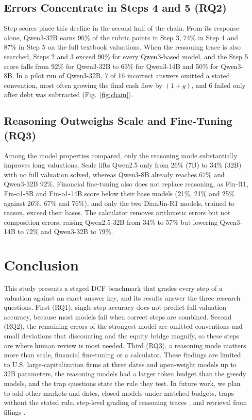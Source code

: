 \documentclass[conference]{IEEEtran}
\begin{document}
\subsection{Errors Concentrate in Steps 4 and 5 (RQ2)}
Step scores place this decline in the second half of the chain. From its response alone, Qwen3-32B earns 96\% of the rubric points in Step 3, 74\% in Step 4 and 87\% in Step 5 on the full textbook valuations. When the reasoning trace is also searched, Steps 2 and 3 exceed 90\% for every Qwen3-based model, and the Step 5 score falls from 92\% for Qwen3-32B to 63\% for Qwen3-14B and 50\% for Qwen3-8B. In a pilot run of Qwen3-32B, 7 of 16 incorrect answers omitted a stated convention, most often growing the final cash flow by $(1+g)$, and 6 failed only after debt was subtracted (Fig.~\ref{fig:chain}).

\subsection{Reasoning Outweighs Scale and Fine-Tuning (RQ3)}
Among the model properties compared, only the reasoning mode substantially improves long valuations. Scale lifts Qwen2.5 only from 26\% (7B) to 34\% (32B) with no full valuation solved, whereas Qwen3-8B already reaches 67\% and Qwen3-32B 92\%. Financial fine-tuning also does not replace reasoning, as Fin-R1, Fin-o1-8B and Fin-o1-14B score below their base models (21\%, 21\% and 25\% against 26\%, 67\% and 76\%), and only the two DianJin-R1 models, trained to reason, exceed their bases. The calculator removes arithmetic errors but not composition errors, raising Qwen2.5-32B from 34\% to 57\% but lowering Qwen3-14B to 72\% and Qwen3-32B to 79\%.

\section{Conclusion}
This study presents a staged DCF benchmark that grades every step of a valuation against an exact answer key, and its results answer the three research questions. First (RQ1), single-step accuracy does not predict full-valuation accuracy, because most models fail when correct steps are combined. Second (RQ2), the remaining errors of the strongest model are omitted conventions and small deviations that discounting and the equity bridge magnify, so these steps are where human review is most needed. Third (RQ3), a reasoning mode matters more than scale, financial fine-tuning or a calculator. These findings are limited to U.S. large-capitalization firms at three dates and open-weight models up to 32B parameters, the reasoning models had a larger token budget than the greedy models, and the trap questions state the rule they test. In future work, we plan to add other markets and dates, closed models under matched budgets, traps without the stated rule, step-level grading of reasoning traces \cite{b16,b17}, and retrieval from filings \cite{b5}.
\end{document}
